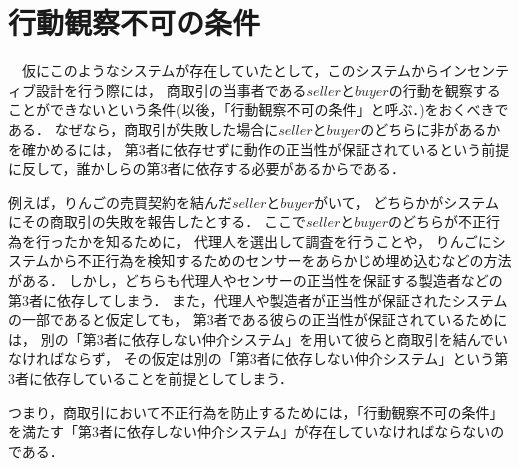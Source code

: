 \section{行動観察不可の条件}
  　仮にこのようなシステムが存在していたとして，このシステムからインセンティブ設計を行う際には，
  商取引の当事者である$seller$と$buyer$の行動を観察することができないという条件(以後，「行動観察不可の条件」と呼ぶ．)をおくべきである．
  なぜなら，商取引が失敗した場合に$seller$と$buyer$のどちらに非があるかを確かめるには，
  第3者に依存せずに動作の正当性が保証されているという前提に反して，誰かしらの第3者に依存する必要があるからである．

  例えば，りんごの売買契約を結んだ$seller$と$buyer$がいて，
  どちらかがシステムにその商取引の失敗を報告したとする．
  ここで$seller$と$buyer$のどちらが不正行為を行ったかを知るために，
  代理人を選出して調査を行うことや，
  りんごにシステムから不正行為を検知するためのセンサーをあらかじめ埋め込むなどの方法がある．
  しかし，どちらも代理人やセンサーの正当性を保証する製造者などの第3者に依存してしまう．
  また，代理人や製造者が正当性が保証されたシステムの一部であると仮定しても，
  第3者である彼らの正当性が保証されているためには，
  別の「第3者に依存しない仲介システム」を用いて彼らと商取引を結んでいなければならず，
  その仮定は別の「第3者に依存しない仲介システム」という第3者に依存していることを前提としてしまう．

  つまり，商取引において不正行為を防止するためには，「行動観察不可の条件」を満たす「第3者に依存しない仲介システム」が存在していなければならないのである．
